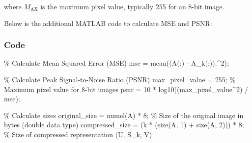 \documentclass[
  journal,
]{IEEEtran}%
\newenvironment{Shaded}{\begin{snugshade}}{\end{snugshade}}
\newcommand{\CommentTok}[1]{\textcolor[rgb]{0.37,0.37,0.37}{#1}}
\newcommand{\FloatTok}[1]{\textcolor[rgb]{0.68,0.00,0.00}{#1}}
\newcommand{\NormalTok}[1]{\textcolor[rgb]{0.00,0.23,0.31}{#1}}
\newcommand{\OperatorTok}[1]{\textcolor[rgb]{0.37,0.37,0.37}{#1}}
\newcommand{\VariableTok}[1]{\textcolor[rgb]{0.07,0.07,0.07}{#1}}
\begin{document}
where \(M_{\text{AX}}\) is the maximum pixel value, typically 255 for an
8-bit image.

Below is the additional MATLAB code to calculate MSE and PSNR:

\subsubsection{Code}

\begin{Shaded}
\begin{Highlighting}[]
\CommentTok{\% Calculate Mean Squared Error (MSE)}
\VariableTok{mse} \OperatorTok{=} \VariableTok{mean}\NormalTok{((}\VariableTok{A}\NormalTok{(}\OperatorTok{:}\NormalTok{) }\OperatorTok{{-}} \VariableTok{A\_k}\NormalTok{(}\OperatorTok{:}\NormalTok{))}\OperatorTok{.\^{}}\FloatTok{2}\NormalTok{)}\OperatorTok{;}

\CommentTok{\% Calculate Peak Signal{-}to{-}Noise Ratio (PSNR)}
\VariableTok{max\_pixel\_value} \OperatorTok{=} \FloatTok{255}\OperatorTok{;} \CommentTok{\% Maximum pixel value for 8{-}bit images}
\VariableTok{psnr} \OperatorTok{=} \FloatTok{10} \OperatorTok{*} \VariableTok{log10}\NormalTok{((}\VariableTok{max\_pixel\_value}\OperatorTok{\^{}}\FloatTok{2}\NormalTok{) }\OperatorTok{/} \VariableTok{mse}\NormalTok{)}\OperatorTok{;}

\CommentTok{\% Calculate sizes}
\VariableTok{original\_size} \OperatorTok{=} \VariableTok{numel}\NormalTok{(}\VariableTok{A}\NormalTok{) }\OperatorTok{*} \FloatTok{8}\OperatorTok{;} \CommentTok{\% Size of the original image in bytes (double data type)}
\VariableTok{compressed\_size} \OperatorTok{=}\NormalTok{ (}\VariableTok{k} \OperatorTok{*}\NormalTok{ (}\VariableTok{size}\NormalTok{(}\VariableTok{A}\OperatorTok{,} \FloatTok{1}\NormalTok{) }\OperatorTok{+} \VariableTok{size}\NormalTok{(}\VariableTok{A}\OperatorTok{,} \FloatTok{2}\NormalTok{))) }\OperatorTok{*} \FloatTok{8}\OperatorTok{;} \CommentTok{\% Size of compressed representation (U, S\_k, V)}


\end{Highlighting}
\end{Shaded}
\end{document}

